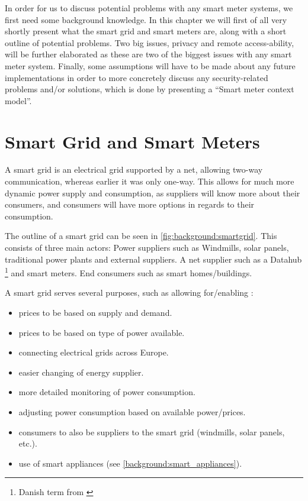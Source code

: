 In order for us to discuss potential problems with any smart meter systems, we first need some background knowledge.
In this chapter we will first of all very shortly present what the smart grid and smart meters are, along with a short outline of potential problems.
Two big issues, privacy and remote access-ability, will be further elaborated as these are two of the biggest issues with any smart meter system.
Finally, some assumptions will have to be made about any future implementations in order to more concretely discuss any security-related problems and/or solutions, which is done by presenting a ``Smart meter context model''.

\section{Smart Grid and Smart Meters}
A smart grid is an electrical grid supported by a net, allowing two-way communication, whereas earlier it was only one-way.
This allows for much more dynamic power supply and consumption, as suppliers will know more about their consumers, and consumers will have more options in regards to their consumption.

The outline of a smart grid can be seen in \cref{fig:background:smartgrid}.
This consists of three main actors:
Power suppliers such as Windmills, solar panels, traditional power plants and external suppliers.
A net supplier such as a Datahub \footnote{Danish term from \cite{LOV_nr_575_af_18-06-2012}} and smart meters.
End consumers such as smart homes/buildings.

A smart grid serves several purposes, such as allowing for/enabling \cite{smartgrid_gov, directive_2009_72_EC}:
\begin{itemize}
	\item prices to be based on supply and demand.
	\item prices to be based on type of power available.
	\item connecting electrical grids across Europe.
	\item easier changing of energy supplier.
	\item more detailed monitoring of power consumption.
	\item adjusting power consumption based on available power/prices.
	\item consumers to also be suppliers to the smart grid (windmills, solar panels, etc.).
	\item use of smart appliances (see \cref{background:smart_appliances}).
\end{itemize}

